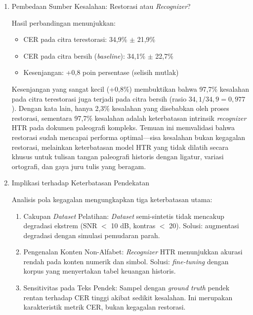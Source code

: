 \documentclass[12pt,a4paper]{article}
\begin{document}
\begin{enumerate}[leftmargin=1.5em, labelsep=0.5em, itemindent=0pt, label=\arabic*., topsep=0pt, partopsep=0pt]
\item Pembedaan Sumber Kesalahan: Restorasi atau \textit{Recognizer}?

Hasil perbandingan menunjukkan:
\begin{itemize}[leftmargin=1.5em, labelsep=0.5em, itemindent=0pt, noitemsep, topsep=0pt, partopsep=0pt]
    \item CER pada citra terestorasi: 34,9\% $\pm$ 21,9\%
    \item CER pada citra bersih (\textit{baseline}): 34,1\% $\pm$ 22,7\%
    \item Kesenjangan: +0,8 poin persentase (selisih mutlak)
\end{itemize}

Kesenjangan yang sangat kecil (+0,8\%) membuktikan bahwa 97,7\% kesalahan pada citra terestorasi juga terjadi pada citra bersih (rasio $34,1/34,9 = 0,977$). Dengan kata lain, hanya 2,3\% kesalahan yang disebabkan oleh proses restorasi, sementara 97,7\% kesalahan adalah keterbatasan intrinsik \textit{recognizer} HTR pada dokumen paleografi kompleks. Temuan ini memvalidasi bahwa restorasi sudah mencapai performa optimal---sisa kesalahan bukan kegagalan restorasi, melainkan keterbatasan model HTR yang tidak dilatih secara khusus untuk tulisan tangan paleografi historis dengan ligatur, variasi ortografi, dan gaya juru tulis yang beragam.

\item Implikasi terhadap Keterbatasan Pendekatan

Analisis pola kegagalan mengungkapkan tiga keterbatasan utama:
\begin{enumerate}[leftmargin=1.5em, labelsep=0.5em, itemindent=0pt, noitemsep, topsep=0pt, partopsep=0pt, label=\alph*)]
    \item Cakupan \textit{Dataset} Pelatihan: \textit{Dataset} semi-sintetis tidak mencakup degradasi ekstrem (SNR $<$ 10 dB, kontras $<$ 20). Solusi: augmentasi degradasi dengan simulasi pemudaran parah.
    
    \item Pengenalan Konten Non-Alfabet: \textit{Recognizer} HTR menunjukkan akurasi rendah pada konten numerik dan simbol. Solusi: \textit{fine-tuning} dengan korpus yang menyertakan tabel keuangan historis.
    
    \item Sensitivitas pada Teks Pendek: Sampel dengan \textit{ground truth} pendek rentan terhadap CER tinggi akibat sedikit kesalahan. Ini merupakan karakteristik metrik CER, bukan kegagalan restorasi.
\end{enumerate}


\end{enumerate}
\end{document}
